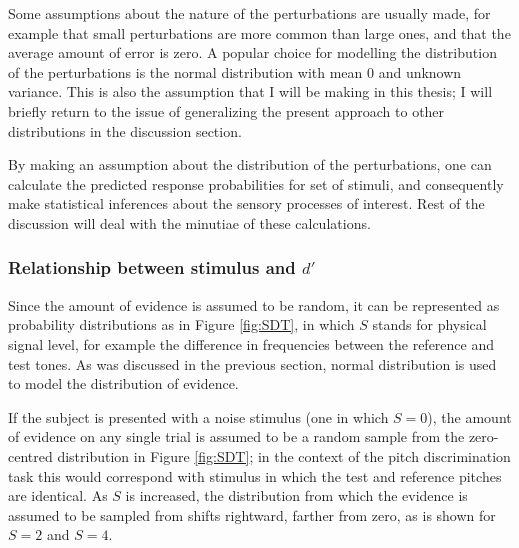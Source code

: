 \documentclass{article}\usepackage{knitr}
\begin{document}
Some assumptions about the nature of the perturbations are usually made, for example that small perturbations are more common than large ones, and that the average amount of error is zero. A popular choice for modelling the distribution of the perturbations is the normal distribution with mean 0 and unknown variance. This is also the assumption that I will be making in this thesis; I will briefly return to the issue of generalizing the present approach to other distributions in the discussion section. 

By making an assumption about the distribution of the perturbations, one can calculate the predicted response probabilities for set of stimuli, and consequently make statistical inferences about the sensory processes of interest. Rest of the discussion will deal with the minutiae of these calculations. 

\subsubsection{Relationship between stimulus and $d'$}

Since the amount of evidence is assumed to be random, it can be represented as probability distributions as in Figure \ref{fig:SDT}, in which $S$ stands for physical signal level, for example the difference in frequencies between the reference and test tones. As was discussed in the previous section, normal distribution is used to model the distribution of evidence. 

If the subject is presented with a noise stimulus (one in which $S = 0$), the amount of evidence on any single trial is assumed to be a random sample from the zero-centred distribution in Figure \ref{fig:SDT}; in the context of the pitch discrimination task this would correspond with stimulus in which the test and reference pitches are identical. As $S$ is increased, the distribution from which the evidence is assumed to be sampled from shifts rightward, farther from zero, as is shown for $S = 2$ and $S = 4$.
\end{document}

